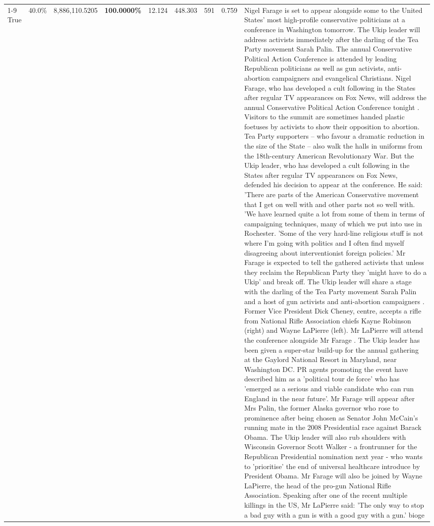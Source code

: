 \begin{table}[H]
\begin{tabular}{lllrlllll}
\cline{1-9}
True & 40.0\% & 8,886,110.5205 & \bfseries \color{red} 100.0000\% & 12.124 & 448.303 & 591 & 0.759 & Nigel Farage is set to appear alongside some to the United States' most high-profile conservative politicians at a conference in Washington tomorrow. The Ukip leader will address activists immediately after the darling of the Tea Party movement Sarah Palin. The annual Conservative Political Action Conference is attended by leading Republican politicians as well as gun activists, anti-abortion campaigners and evangelical Christians. Nigel Farage, who has developed a cult following in the States after regular TV appearances on Fox News, will address the annual Conservative Political Action Conference tonight . Visitors to the summit are sometimes handed plastic foetuses by activists to show their opposition to abortion. Tea Party supporters – who favour a dramatic reduction in the size of the State – also walk the halls in uniforms from the 18th-century American Revolutionary War. But the Ukip leader, who has developed a cult following in the States after regular TV appearances on Fox News, defended his decision to appear at the conference. He said: 'There are parts of the American Conservative movement that I get on well with and other parts not so well with. 'We have learned quite a lot from some of them in terms of campaigning techniques, many of which we put into use in Rochester. 'Some of the very hard-line religious stuff is not where I'm going with politics and I often find myself disagreeing about interventionist foreign policies.' Mr Farage is expected to tell the gathered activists that unless they reclaim the Republican Party they 'might have to do a Ukip' and break off. The Ukip leader will share a stage with the darling of the Tea Party movement Sarah Palin and a host of gun activists and anti-abortion campaigners . Former Vice President Dick Cheney, centre, accepts a rifle from National Rifle Association chiefs Kayne Robinson (right) and Wayne LaPierre (left). Mr LaPierre will attend the conference alongside Mr Farage . The Ukip leader has been given a super-star build-up for the annual gathering at the Gaylord National Resort in Maryland, near Washington DC. PR agents promoting the event have described him as a 'political tour de force' who has 'emerged as a serious and viable candidate who can run England in the near future'. Mr Farage will appear after Mrs Palin, the former Alaska governor who rose to prominence after being chosen as Senator John McCain's running mate in the 2008 Presidential race against Barack Obama. The Ukip leader will also rub shoulders with Wisconsin Governor Scott Walker - a frontrunner for the Republican Presidential nomination next year - who wants to 'prioritise' the end of universal healthcare introduce by President Obama. Mr Farage will also be joined by Wayne LaPierre, the head of the pro-gun National Rifle Association. Speaking after one of the recent multiple killings in the US, Mr LaPierre said: 'The only way to stop a bad guy with a gun is with a good guy with a gun.' bioge \\

\end{tabular}
\end{table}
